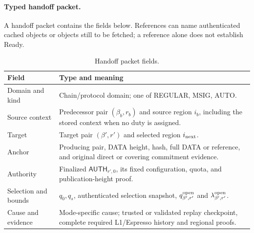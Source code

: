 \documentclass[11pt,a4paper]{article}
\newcommand{\tagg}[1]{\ensuremath{\mathsf{#1}}}
\newcounter{protocol}
\begin{document}
\paragraph{Typed handoff packet.}
A handoff packet contains the fields below. References can name
authenticated cached objects or objects still to be fetched; a reference
alone does not establish Ready.
\begin{table}[htbp]\centering\small
\caption{Handoff packet fields.}
\label{tab:handoff-packet}
\begin{tabularx}{\linewidth}{@{}>{\raggedright\arraybackslash}p{.26\linewidth}Y@{}}\toprule
Field & Type and meaning\\\midrule
Domain and kind & Chain/protocol domain; one of REGULAR, MSIG, AUTO.\\
Source context & Predecessor pair $(\beta_b,r_b)$ and source region
$i_b$, including the stored context when no duty is assigned.\\
Target & Target pair $(\beta',r')$ and selected region $i_{\rm next}$.\\
Anchor & Producing pair, DATA height, hash, full DATA or reference,
and original direct or covering commitment evidence.\\
Authority & Finalized $\tagg{AUTH}_{r',0}$, its fixed configuration,
quota, and publication-height proof.\\
Selection and bounds & $q_0,q_s$, authenticated selection snapshot,
$q^{\rm open}_{\beta',r'}$ and $\lambda^{\rm open}_{\beta',r'}$.\\
Cause and evidence & Mode-specific cause; trusted or validated replay
checkpoint, complete required L1/Espresso history and regional proofs.\\\bottomrule
\end{tabularx}
\end{table}
\end{document}
